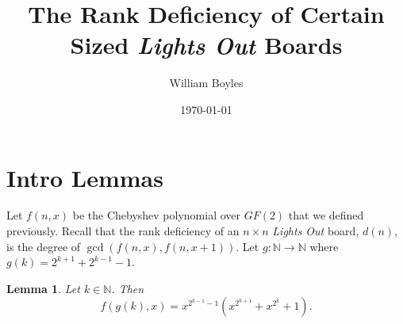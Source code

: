 \documentclass{article}
\newtheorem{lemma}{Lemma}
\newcommand{\N}{\mathbb{N}}
\begin{document}
	\title{The Rank Deficiency of Certain Sized \textit{Lights Out} Boards}
	\author{William Boyles}
	\date{\today}
	\maketitle
	
	\section{Intro Lemmas}
	Let $f(n,x)$ be the Chebyshev polynomial over $GF(2)$ that we defined previously.
	Recall that the rank deficiency of an $n \times n$ \textit{Lights Out} board, $d(n)$, is the degree of $\gcd(f(n,x), f(n,x+1))$.
	Let $g: \N \to \N$ where $g(k) = 2^{k+1} + 2^{k-1} - 1$.

	\begin{lemma}
		\label{conj1}
		Let $k \in \N$.
		Then
		\begin{equation*}
			f(g(k), x) = x^{2^{k-1}-1}\left(x^{2^{k+1}}+x^{2^k}+1\right).
		\end{equation*}
	\end{lemma}
\end{document}

